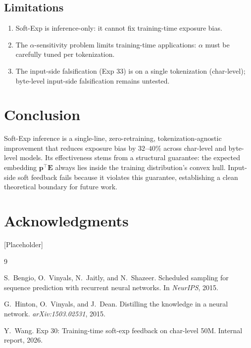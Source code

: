 \documentclass[11pt]{article}
\begin{document}
\subsection{Limitations}

\begin{enumerate}
    \item Soft-Exp is inference-only: it cannot fix training-time exposure bias.
    \item The $\alpha$-sensitivity problem limits training-time applications: $\alpha$ must be carefully tuned per tokenization.
    \item The input-side falsification (Exp 33) is on a single tokenization (char-level); byte-level input-side falsification remains untested.
\end{enumerate}

\section{Conclusion}

Soft-Exp inference is a single-line, zero-retraining, tokenization-agnostic improvement that reduces exposure bias by $32$--$40\%$ across char-level and byte-level models. Its effectiveness stems from a structural guarantee: the expected embedding $\mathbf{p}^\top \mathbf{E}$ always lies inside the training distribution's convex hull. Input-side soft feedback fails because it violates this guarantee, establishing a clean theoretical boundary for future work.

\section*{Acknowledgments}

[Placeholder]


\begin{thebibliography}{9}

S.~Bengio, O.~Vinyals, N.~Jaitly, and N.~Shazeer.
Scheduled sampling for sequence prediction with recurrent neural networks.
In \emph{NeurIPS}, 2015.

G.~Hinton, O.~Vinyals, and J.~Dean.
Distilling the knowledge in a neural network.
\emph{arXiv:1503.02531}, 2015.

Y.~Wang.
Exp 30: Training-time soft-exp feedback on char-level 50M.
Internal report, 2026.

\end{thebibliography}
\end{document}
